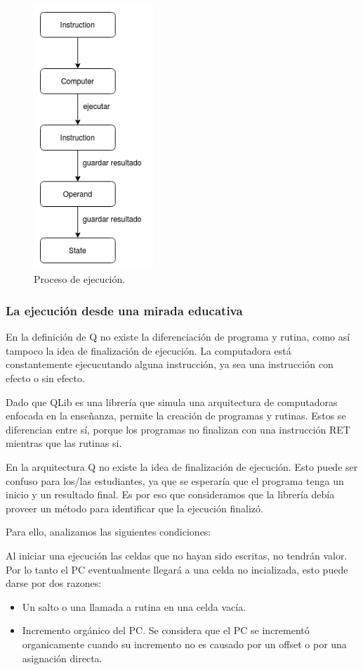 \begin{figure}[H]
  \centering
  \includegraphics[width=4.5cm]{figuras/ejecucion_grafico.png}
  \caption{Proceso de ejecución.}
\end{figure}

\subsubsection*{La ejecución desde una mirada educativa}
En la definición de Q no existe la diferenciación de programa y rutina, como así tampoco la idea de finalización de ejecución. La computadora
está constantemente ejecucutando alguna instrucción, ya sea una instrucción con efecto o sin efecto.

Dado que QLib es una librería que simula una arquitectura de computadoras enfocada en la enseñanza, permite la creación de programas y rutinas. 
Estos se diferencian entre sí, porque los programas no finalizan con una instrucción RET mientras que las rutinas si. 

En la arquitectura Q no existe la idea de finalización de ejecución. Esto puede ser confuso para los/las estudiantes, ya que se esperaría que el programa tenga un inicio y 
un resultado final. Es por eso que consideramos que la librería debía proveer un método para identificar que la ejecución finalizó. 

Para ello, analizamos las siguientes condiciones: 

Al iniciar una ejecución las celdas que no hayan sido escritas, no tendrán valor. Por lo tanto el PC eventualmente llegará a una celda no incializada, esto puede darse por dos 
razones:
\begin{itemize}
  \item Un salto o una llamada a rutina en una celda vacía.
  \item Incremento orgánico del PC. Se considera que el PC se incrementó organicamente cuando su incremento no es causado por un offset o por una asignación directa.
\end{itemize}

